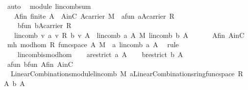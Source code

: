 \begin{isabellebody}
\ auto\isanewline
{}\isamarkupfalse%
%
\endisatagproof
{\isafoldproof}%
%
\isadelimproof
\isanewline
%
\endisadelimproof
\isanewline
\isanewline
{}\isamarkupfalse%
\ {\isacharparenleft}\ module{\isacharparenright}\ lincomb{\isacharunderscore}sum{\isacharcolon}\isanewline
\ \ \ A{\isacharunderscore}fin{\isacharcolon}\ {\isachardoublequoteopen}finite\ A{\isachardoublequoteclose}\ \ AinC{\isacharcolon}\ {\isachardoublequoteopen}A{\isasymsubseteq}carrier\ M{\isachardoublequoteclose}\ \ a{\isacharunderscore}fun{\isacharcolon}\ {\isachardoublequoteopen}a{\isasymin}A{\isasymrightarrow}carrier\ R{\isachardoublequoteclose}\ \ \isanewline
\ \ \ \ b{\isacharunderscore}fun{\isacharcolon}\ {\isachardoublequoteopen}b{\isasymin}A{\isasymrightarrow}carrier\ R{\isachardoublequoteclose}\ \isanewline
\ \ \ {\isachardoublequoteopen}lincomb\ {\isacharparenleft}{\isasymlambda}v{\isachardot}\ a\ v\ {\isasymoplus}\isactrlbsub R\isactrlesub \ b\ v{\isacharparenright}\ A\ {\isacharequal}\ lincomb\ a\ A\ {\isasymoplus}\isactrlbsub M\isactrlesub \ lincomb\ b\ A{\isachardoublequoteclose}\isanewline
%
\isadelimproof
%
\endisadelimproof
%
\isatagproof
{}\isamarkupfalse%
\ {\isacharminus}\ \isanewline
\ \ \isamarkupfalse%
\ A{\isacharunderscore}fin\ AinC\ \isamarkupfalse%
\ mh{\isacharcolon}\ mod{\isacharunderscore}hom\ R\ {\isachardoublequoteopen}func{\isacharunderscore}space\ A{\isachardoublequoteclose}\ M\ \ {\isachardoublequoteopen}{\isacharparenleft}{\isasymlambda}a{\isachardot}\ lincomb\ a\ A{\isacharparenright}{\isachardoublequoteclose}\ \isamarkupfalse%
\ {\isacharparenleft}rule\ \isanewline
\ \ \ \ lincomb{\isacharunderscore}is{\isacharunderscore}mod{\isacharunderscore}hom{\isacharparenright}\isanewline
\ \ \isamarkupfalse%
\ {\isacharquery}a{\isacharequal}{\isachardoublequoteopen}restrict\ a\ A{\isachardoublequoteclose}\isanewline
\ \ \isamarkupfalse%
\ {\isacharquery}b{\isacharequal}{\isachardoublequoteopen}restrict\ b\ A{\isachardoublequoteclose}\isanewline
\ \ \isamarkupfalse%
\ a{\isacharunderscore}fun\ b{\isacharunderscore}fun\ A{\isacharunderscore}fin\ AinC\isanewline
\ \ \isamarkupfalse%
\ {}{\isacharcolon}\ {\isachardoublequoteopen}LinearCombinations{\isachardot}module{\isachardot}lincomb\ M\ {\isacharparenleft}{\isacharquery}a{\isasymoplus}\isactrlbsub {\isacharparenleft}LinearCombinations{\isachardot}ring{\isachardot}func{\isacharunderscore}space\ R\ A{\isacharparenright}\isactrlesub \ {\isacharquery}b{\isacharparenright}\ A\isanewline

\end{isabellebody}
